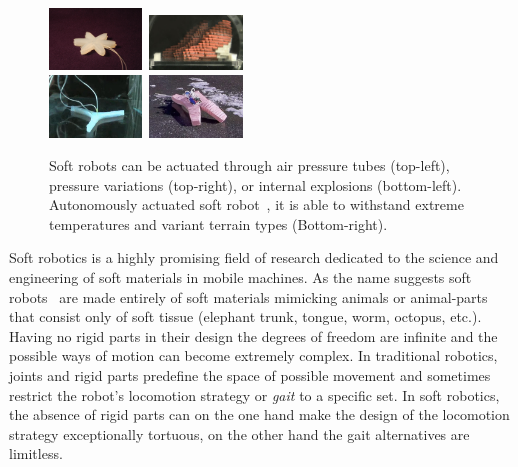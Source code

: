 \documentclass{sig-alternate}
\begin{document}
\begin{figure}[t!]
\centering
\includegraphics[width=0.22\textwidth,height=0.12\textheight]{../Figures/Misc/soft_robotics_figure.png}\		
\includegraphics[width=0.22\textwidth,height=0.12\textheight]{../Figures/Misc/hillerPressureChamber.png}\\[0.1cm]	
\includegraphics[width=0.22\textwidth,height=0.12\textheight]{../Figures/Misc/ExplodingRobot.jpg}\	
\includegraphics[width=0.22\textwidth,height=0.12\textheight]{../Figures/Misc/softbot.jpg}\\
\caption{Soft robots can be actuated through air pressure tubes (top-left), pressure variations (top-right), or internal explosions (bottom-left). Autonomously actuated soft robot~\cite{tolleyresilient}, it is able to withstand extreme temperatures and variant terrain types (Bottom-right).}
\label{fig:softRobotsActuation}
\vspace{-15pt}
\end{figure}

Soft robotics is a highly promising field of research dedicated to the science and engineering of soft materials in mobile machines. As the name suggests soft robots~\cite{trivedi2008soft, pfeifer2012challenges} are made entirely of soft materials mimicking animals or animal-parts that consist only of soft tissue (elephant trunk, tongue, worm, octopus, etc.). Having no rigid parts in their design the degrees of freedom are infinite and the possible ways of motion can become extremely complex. In traditional robotics, joints and rigid parts predefine the space of possible movement and sometimes restrict the robot's locomotion strategy or \emph{gait} to a specific set. In soft robotics, the absence of rigid parts can on the one hand make the design of the locomotion strategy exceptionally tortuous, on the other hand the gait alternatives are limitless.
\end{document}
